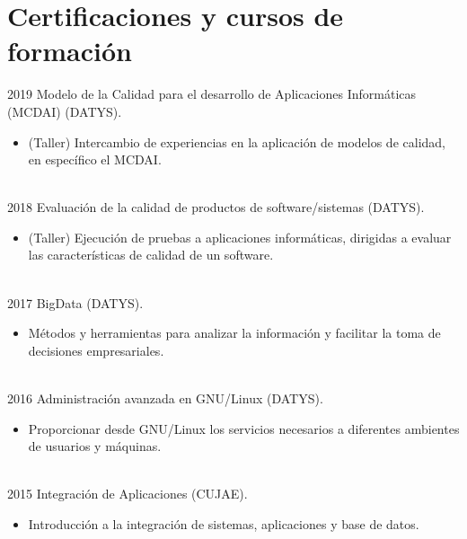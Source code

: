\documentclass[letterpaper]{twentysecondcves} %
\begin{document}
\section{Certificaciones y cursos de formación}

\begin{twenty} %
\twentyitem
    	{2019}
		{}
        {Modelo de la Calidad para el desarrollo de Aplicaciones Informáticas (MCDAI) (DATYS).}
        {}
        {}
        {
        {\begin{itemize}
        \item (Taller) Intercambio de experiencias en la aplicación de modelos de calidad, en específico el MCDAI.
		\end{itemize}}
        }
        \\
\twentyitem
    	{2018}
		{}
        {Evaluación de la calidad de productos de software/sistemas (DATYS).}
        {}
        {}
        {
        {\begin{itemize}
        \item (Taller) Ejecución de pruebas a aplicaciones informáticas, dirigidas a evaluar las características de calidad de un software.
		\end{itemize}}
        }
        \\
\twentyitem
    	{2017}
		{}
        {BigData (DATYS).}
        {}
        {}
         {
        {\begin{itemize}
        \item Métodos y herramientas para analizar la información y facilitar la toma de decisiones empresariales.
		\end{itemize}}
        }
        \\
\twentyitem
    	{2016}
		{}
        {Administración avanzada en GNU/Linux (DATYS).}
        {}
        {}
        {
        {\begin{itemize}
        \item Proporcionar desde GNU/Linux los servicios necesarios a diferentes ambientes de usuarios y máquinas.
		\end{itemize}}
        }
        \\
\twentyitem
    	{2015}
		{}
        {Integración de Aplicaciones (CUJAE).}
        {}
        {}
        {
        {\begin{itemize}
        \item Introducción a la integración de sistemas, aplicaciones y base de datos.
		\end{itemize}}
        }
        \\

\end{twenty}
\end{document}
